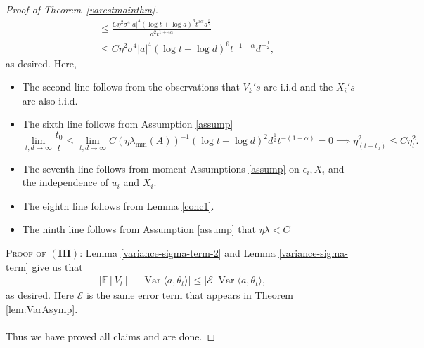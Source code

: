 \documentclass[11pt, reqno,english]{amsart}
\DeclareMathOperator{\Var}{Var} \DeclareMathOperator{\N}{N}
\begin{document}
\begin{proof}[Proof of Theorem~\ref{varestmainthm}]
\begin{align*}
&\leq \frac{C\eta^2\sigma^4|a|^4(\log t + \log d)^6t^{3\alpha}d^{\frac{3}{2}}}{d^2t^{1 + 4\alpha}}
\\
&\leq C\eta^2\sigma^4|a|^4(\log t + \log d)^6 t^{-1-\alpha}d^{-\frac{1}{2}}, 
\end{align*}
as desired. Here,
\begin{itemize}
    \item The second line follows from the observations that $V_k's$ are i.i.d and the $X_i's$ are also i.i.d.
    \item The sixth line follows from Assumption \ref{assump} $$\lim\limits_{t,d \to \infty} \frac{t_0}{t} \leq \lim\limits_{t,d \to \infty}C(\eta \lambda_{\min}(A))^{-1}(\log t + \log d)^2 d^{\frac{1}{2}}t^{-(1 - \alpha)} = 0 \implies \eta^2_{(t-t_0)} \leq C \eta^2_t.$$
    \item The seventh line follows from moment Assumptions \ref{assump} on $\epsilon_i, X_i$ and the independence of $u_i$ and $X_i$.
    \item The eighth line follows from Lemma \ref{conc1}.
    \item The ninth line follows from Assumption \ref{assump} that $\eta \bar{\lambda} < C$
\end{itemize} 
\textsc{Proof of $(\mathbf{III})$:} 
Lemma \ref{variance-sigma-term-2} and Lemma \ref{variance-sigma-term} give us that
\begin{align*}
|\mathbb{E}[V_t] - \Var \langle a, \theta_t \rangle| \leq |\mathcal E|\Var \langle a, \theta_t \rangle,
\end{align*}
as desired. Here $\mathcal E$ is the same error term that appears in Theorem \ref{lem:VarAsymp}. 
\\\\
Thus we have proved all claims and are done.
\end{proof}   
\end{document}
